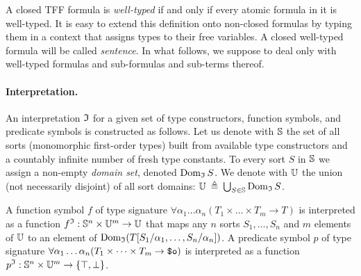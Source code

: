 A closed TFF formula is {\em well-typed\/} if and only if every
atomic formula in it is well-typed. It is easy to extend this
definition onto non-closed formulas by typing them in a context
that assigns types to their free variables. A closed well-typed
formula will be called {\em sentence}. In what follows, we suppose
to deal only with well-typed formulas and sub-formulas
and sub-terms thereof.

\paragraph{Interpretation.}
An interpretation $\mathfrak{I}$ for a given set of type constructors,
function symbols, and predicate symbols is constructed as follows.
Let us denote with $\mathbb{S}$ the set of all sorts (monomorphic
first-order types) built from available type constructors and
a countably infinite number of fresh type constants.
To every sort $S$ in $\mathbb{S}$ we assign a non-empty {\em domain set},
denoted $\operatorname{Dom}_{\mathfrak{I}} S$.
We denote with $\mathbb{U}$ the union (not necessarily disjoint) of
all sort domains: $\mathbb{U} \:\triangleq\: \bigcup_{S\in\mathbb{S}} \operatorname{Dom}_{\mathfrak{I}} S$.

A function symbol $f$ of type signature
$\forall \alpha_1\dots\alpha_n (T_1 \times \dots \times T_m \to T)$
is interpreted as a function
$f^{\mathfrak{I}} : \mathbb{S}^n \times \mathbb{U}^m \to \mathbb{U}$ that
maps any $n$ sorts $S_1,\dots,S_n$ and $m$ elements of $\mathbb{U}$
to an element of $\operatorname{Dom}_{\mathfrak{I}} (T[S_1/\alpha_1,\dots,S_n/\alpha_n])$.
A predicate symbol $p$ of type signature
$\forall \alpha_1\dots\alpha_n (T_1 \times \dots \times T_m
\to \text{\tt \$o})$ is interpreted as a %
function
$p^{\mathfrak{I}} : \mathbb{S}^n \times \mathbb{U}^m \to \{ \top, \bot \}$.

